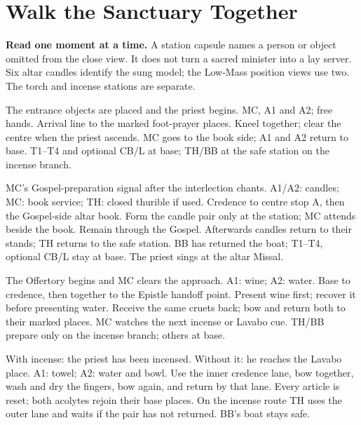 \clearpage
\section{Walk the Sanctuary Together}
\ASGOrientationKey
\noindent\textbf{Read one moment at a time.} A station capsule names a person
or object omitted from the close view. It does not turn a sacred minister
into a lay server. Six altar candles identify the sung model; the Low-Mass
position views use two. The torch and incense stations are separate.

\ifMissaCantataGuide
{}
{\MCFootPositions}
{The entrance objects are placed and the priest begins.}
{MC, A1 and A2; free hands.}
{Arrival line to the marked foot-prayer places. Kneel together; clear the
centre when the priest ascends.}
{MC goes to the book side; A1 and A2 return to base.}
{T1--T4 and optional CB/L at base; TH/BB at the safe station on the incense branch.}

{\MCGospelPositions}
{MC's Gospel-preparation signal after the interlection chants.}
{A1/A2: candles; MC: book service; TH: closed thurible if used.}
{Credence to centre stop A, then the Gospel-side altar book. Form the
candle pair only at the station; MC attends beside the book.}
{Remain through the Gospel. Afterwards candles return to their stands;
TH returns to the safe station.}
{BB has returned the boat; T1--T4, optional CB/L stay at base. The priest sings at the altar Missal.}

{\MCCruetPositions}
{The Offertory begins and MC clears the approach.}
{A1: wine; A2: water.}
{Base to credence, then together to the Epistle handoff point. Present
wine first; recover it before presenting water.}
{Receive the same cruets back; bow and return both to their marked places.}
{MC watches the next incense or Lavabo cue. TH/BB prepare only on the incense branch; others at base.}

{\SungLavaboPositions}
{With incense: the priest has been incensed. Without it: he reaches the Lavabo place.}
{A1: towel; A2: water and bowl.}
{Use the inner credence lane, bow together, wash and dry the fingers, bow
again, and return by that lane.}
{Every article is reset; both acolytes rejoin their base places.}
{On the incense route TH uses the outer lane and waits if the pair has not returned. BB's boat stays safe.}

